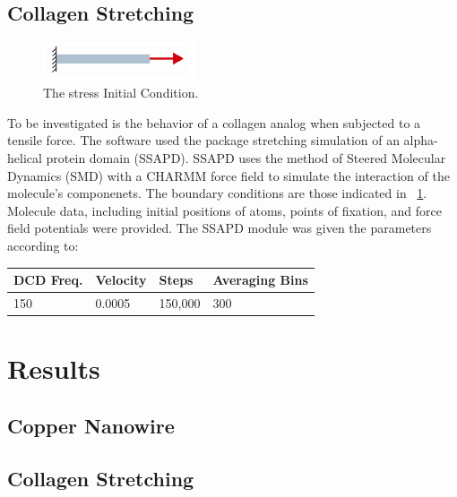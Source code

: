 \documentclass{report}
\begin{document}
        \subsection{Collagen Stretching}
        \begin{figure}[!htb]
            \label{fig:applied-stress-partB}
            \centering
            \includegraphics[width=0.4\textwidth]{applied-stress-partB.png}
            \caption{The stress Initial Condition.}
        \end{figure}
        To be investigated is the behavior of a collagen analog when subjected to a tensile force.  The software used the package stretching simulation of an alpha-helical protein domain (SSAPD).  SSAPD uses the method of Steered Molecular Dynamics (SMD) with a CHARMM force field to simulate the interaction of the molecule's componenets.  The boundary conditions are those indicated in ~\ref{fig:applied-stress-partB}.  Molecule data, including initial positions of atoms, points of fixation, and force field potentials were provided.  The SSAPD module was given the parameters according to:
        \begin{tabular}[!htb]{|l|l|l|l|}
            \hline
            DCD Freq. & Velocity & Steps & Averaging Bins \\
            \hline
            150 & 0.0005 & 150,000 & 300 \\
            \hline
        \end{tabular}

    \section{Results}
        \subsection{Copper Nanowire}



        \subsection{Collagen Stretching}
\end{document}
